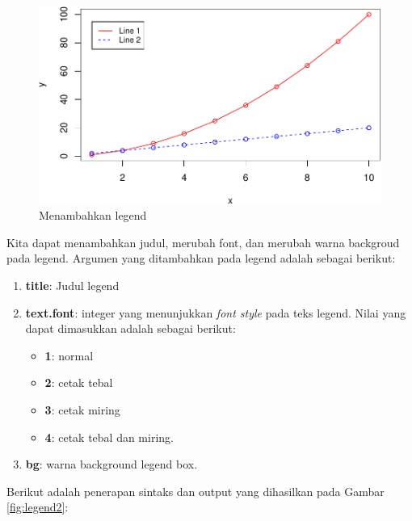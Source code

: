 \documentclass[]{book}
\providecommand{\tightlist}{%
  \setlength{\itemsep}{0pt}\setlength{\parskip}{0pt}}
\begin{document}
\begin{figure}

{\centering \includegraphics[width=0.7\linewidth]{EnvStat_files/figure-latex/legend-1} 

}

\caption{Menambahkan legend}\label{fig:legend}
\end{figure}

Kita dapat menambahkan judul, merubah font, dan merubah warna backgroud
pada legend. Argumen yang ditambahkan pada legend adalah sebagai
berikut:

\begin{enumerate}
\def\labelenumi{\alph{enumi}.}
\tightlist
\item
  \textbf{title}: Judul legend
\item
  \textbf{text.font}: integer yang menunjukkan \emph{font style} pada
  teks legend. Nilai yang dapat dimasukkan adalah sebagai berikut:

  \begin{itemize}
  \tightlist
  \item
    \textbf{1}: normal
  \item
    \textbf{2}: cetak tebal
  \item
    \textbf{3}: cetak miring
  \item
    \textbf{4}: cetak tebal dan miring.
  \end{itemize}
\item
  \textbf{bg}: warna background legend box.
\end{enumerate}

Berikut adalah penerapan sintaks dan output yang dihasilkan pada Gambar
\ref{fig:legend2}:
\end{document}
